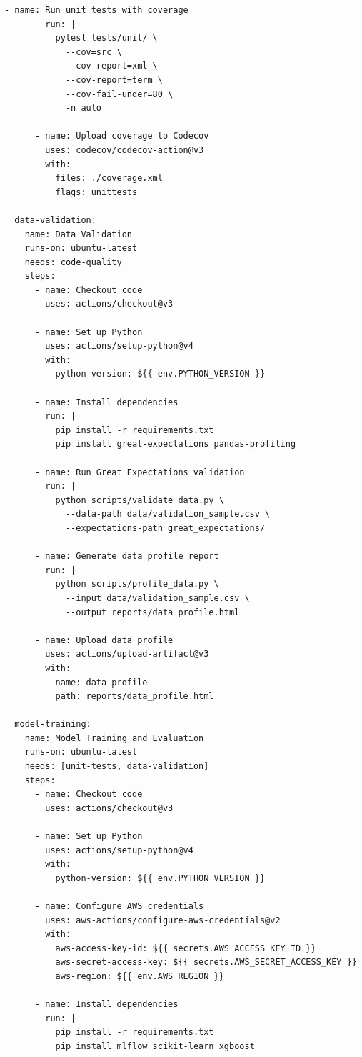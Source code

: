 \begin{lstlisting}[style=yaml, caption=.github/workflows/ml-pipeline.yml]
      - name: Run unit tests with coverage
        run: |
          pytest tests/unit/ \
            --cov=src \
            --cov-report=xml \
            --cov-report=term \
            --cov-fail-under=80 \
            -n auto

      - name: Upload coverage to Codecov
        uses: codecov/codecov-action@v3
        with:
          files: ./coverage.xml
          flags: unittests

  data-validation:
    name: Data Validation
    runs-on: ubuntu-latest
    needs: code-quality
    steps:
      - name: Checkout code
        uses: actions/checkout@v3

      - name: Set up Python
        uses: actions/setup-python@v4
        with:
          python-version: ${{ env.PYTHON_VERSION }}

      - name: Install dependencies
        run: |
          pip install -r requirements.txt
          pip install great-expectations pandas-profiling

      - name: Run Great Expectations validation
        run: |
          python scripts/validate_data.py \
            --data-path data/validation_sample.csv \
            --expectations-path great_expectations/

      - name: Generate data profile report
        run: |
          python scripts/profile_data.py \
            --input data/validation_sample.csv \
            --output reports/data_profile.html

      - name: Upload data profile
        uses: actions/upload-artifact@v3
        with:
          name: data-profile
          path: reports/data_profile.html

  model-training:
    name: Model Training and Evaluation
    runs-on: ubuntu-latest
    needs: [unit-tests, data-validation]
    steps:
      - name: Checkout code
        uses: actions/checkout@v3

      - name: Set up Python
        uses: actions/setup-python@v4
        with:
          python-version: ${{ env.PYTHON_VERSION }}

      - name: Configure AWS credentials
        uses: aws-actions/configure-aws-credentials@v2
        with:
          aws-access-key-id: ${{ secrets.AWS_ACCESS_KEY_ID }}
          aws-secret-access-key: ${{ secrets.AWS_SECRET_ACCESS_KEY }}
          aws-region: ${{ env.AWS_REGION }}

      - name: Install dependencies
        run: |
          pip install -r requirements.txt
          pip install mlflow scikit-learn xgboost


\end{lstlisting}
